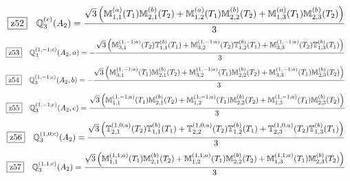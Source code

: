 \documentclass[fleqn,10pt,landscape]{jsarticle}
\begin{document}
\begin{dmath*}
\hspace*{3mm}\fbox{z52}\quad \mathbb{Q}_{3}^{(c)}(A_{2})=\frac{\sqrt{3} \left(\mathbb{M}_{1,1}^{(a)}(T_{1}) \mathbb{M}_{2,1}^{(b)}(T_{2}) + \mathbb{M}_{1,2}^{(a)}(T_{1}) \mathbb{M}_{2,2}^{(b)}(T_{2}) + \mathbb{M}_{1,3}^{(a)}(T_{1}) \mathbb{M}_{2,3}^{(b)}(T_{2})\right)}{3}
\end{dmath*}
\begin{dmath*}
\hspace*{3mm}\fbox{z53}\quad \mathbb{Q}_{3}^{(1,-1;c)}(A_{2},a)=- \frac{\sqrt{3} \left(\mathbb{M}_{3,1}^{(1,-1;a)}(T_{2}) \mathbb{T}_{1,1}^{(b)}(T_{1}) + \mathbb{M}_{3,2}^{(1,-1;a)}(T_{2}) \mathbb{T}_{1,2}^{(b)}(T_{1}) + \mathbb{M}_{3,3}^{(1,-1;a)}(T_{2}) \mathbb{T}_{1,3}^{(b)}(T_{1})\right)}{3}
\end{dmath*}
\begin{dmath*}
\hspace*{3mm}\fbox{z54}\quad \mathbb{Q}_{3}^{(1,-1;c)}(A_{2},b)=- \frac{\sqrt{3} \left(\mathbb{M}_{3,1}^{(1,-1;a)}(T_{1}) \mathbb{M}_{2,1}^{(b)}(T_{2}) + \mathbb{M}_{3,2}^{(1,-1;a)}(T_{1}) \mathbb{M}_{2,2}^{(b)}(T_{2}) + \mathbb{M}_{3,3}^{(1,-1;a)}(T_{1}) \mathbb{M}_{2,3}^{(b)}(T_{2})\right)}{3}
\end{dmath*}
\begin{dmath*}
\hspace*{3mm}\fbox{z55}\quad \mathbb{Q}_{3}^{(1,-1;c)}(A_{2},c)=\frac{\sqrt{3} \left(\mathbb{M}_{1,1}^{(1,-1;a)}(T_{1}) \mathbb{M}_{2,1}^{(b)}(T_{2}) + \mathbb{M}_{1,2}^{(1,-1;a)}(T_{1}) \mathbb{M}_{2,2}^{(b)}(T_{2}) + \mathbb{M}_{1,3}^{(1,-1;a)}(T_{1}) \mathbb{M}_{2,3}^{(b)}(T_{2})\right)}{3}
\end{dmath*}
\begin{dmath*}
\hspace*{3mm}\fbox{z56}\quad \mathbb{Q}_{3}^{(1,0;c)}(A_{2})=\frac{\sqrt{3} \left(\mathbb{T}_{2,1}^{(1,0;a)}(T_{2}) \mathbb{T}_{1,1}^{(b)}(T_{1}) + \mathbb{T}_{2,2}^{(1,0;a)}(T_{2}) \mathbb{T}_{1,2}^{(b)}(T_{1}) + \mathbb{T}_{2,3}^{(1,0;a)}(T_{2}) \mathbb{T}_{1,3}^{(b)}(T_{1})\right)}{3}
\end{dmath*}
\begin{dmath*}
\hspace*{3mm}\fbox{z57}\quad \mathbb{Q}_{3}^{(1,1;c)}(A_{2})=\frac{\sqrt{3} \left(\mathbb{M}_{1,1}^{(1,1;a)}(T_{1}) \mathbb{M}_{2,1}^{(b)}(T_{2}) + \mathbb{M}_{1,2}^{(1,1;a)}(T_{1}) \mathbb{M}_{2,2}^{(b)}(T_{2}) + \mathbb{M}_{1,3}^{(1,1;a)}(T_{1}) \mathbb{M}_{2,3}^{(b)}(T_{2})\right)}{3}
\end{dmath*}
\end{document}
